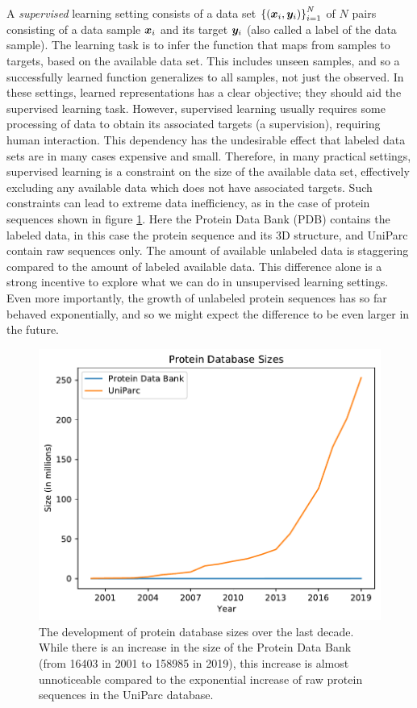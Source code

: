 A \textit{supervised} learning setting consists of a data set ${\mathopen{} \left\{ {\mathopen{} \left( \bm{ x }_i, \bm{ y }_i \right) \mathclose{}} \right\} \mathclose{}}^N_{i=1}$ of $N$ pairs consisting of a data sample $\bm{ x }_i$ and its target $\bm{ y }_i$ (also called a label of the data sample). The learning task is to infer the function that maps from samples to targets, based on the available data set. This includes unseen samples, and so a successfully learned function generalizes to all samples, not just the observed. In these settings, learned representations has a clear objective; they should aid the supervised learning task. However, supervised learning usually requires some processing of data to obtain its associated targets (a supervision), requiring human interaction. This dependency has the undesirable effect that labeled data sets are in many cases expensive and small. Therefore, in many practical settings, supervised learning is a constraint on the size of the available data set, effectively excluding any available data which does not have associated targets. Such constraints can lead to extreme data inefficiency, as in the case of protein sequences shown in figure \ref{fig:data_increase}. Here the Protein Data Bank (PDB) contains the labeled data, in this case the protein sequence and its 3D structure, and UniParc contain raw sequences only. The amount of available unlabeled data is staggering compared to the amount of labeled available data. This difference alone is a strong incentive to explore what we can do in unsupervised learning settings. Even more importantly, the growth of unlabeled protein sequences has so far behaved exponentially, and so we might expect the difference to be even larger in the future.

\begin{figure}[ht]
    \centering
    \includegraphics{report/figures/protein_size.pdf}
    \caption{The development of protein database sizes over the last decade. While there is an increase in the size of the Protein Data Bank (from 16403 in 2001 to 158985 in 2019), this increase is almost unnoticeable compared to the exponential increase of raw protein sequences in the UniParc database.}
    \label{fig:data_increase}
\end{figure}

